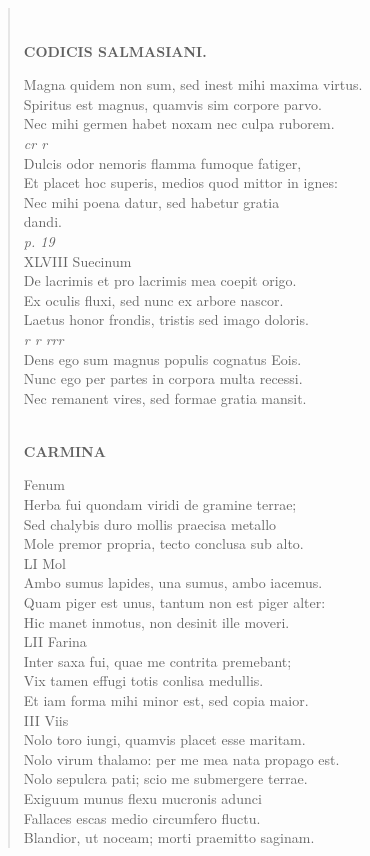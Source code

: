 \documentclass[11pt, a4paper]{report}
\begin{document}
\begin{verse}
        ﻿\pagebreak 
    \begin{center} \textbf{CODICIS SALMASIANI.} \end{center} \marginpar{[233]} Magna quidem non sum, sed inest mihi maxima virtus. \\ Spiritus est magnus, quamvis sim corpore parvo. \\ Nec mihi germen habet noxam nec culpa ruborem. \\ \textit{cr r} \\ Dulcis odor nemoris flamma fumoque fatiger, \\ Et placet hoc superis, medios quod mittor in ignes: \\ Nec mihi poena datur, sed habetur gratia \\ dandi. \\ \textit{p. 19} \\ XLVIII Suecinum \\ De lacrimis et pro lacrimis mea coepit origo. \\ Ex oculis fluxi, sed nunc ex arbore nascor. \\ Laetus honor frondis, tristis sed imago doloris. \\ \textit{r r rrr} \\ Dens ego sum magnus populis cognatus Eois. \\ Nunc ego per partes in corpora multa recessi. \\ Nec remanent vires, sed formae gratia mansit. \\ 
        ﻿\pagebreak 
    \begin{center} \textbf{CARMINA} \end{center} \marginpar{[234]}  \marginpar{[02]} Fenum \\ Herba fui quondam viridi de gramine terrae; \\ Sed chalybis duro mollis praecisa metallo \\ Mole premor propria, tecto conclusa sub alto. \\ LI Mol \\ Ambo sumus lapides, una sumus, ambo iacemus. \\ Quam piger est unus, tantum non est piger alter: \\ Hic manet inmotus, non desinit ille moveri. \\ LII Farina \\ Inter saxa fui, quae me contrita premebant; \\ Vix tamen effugi totis conlisa medullis. \\ Et iam forma mihi minor est, sed copia maior. \\ III Viis \\ Nolo toro iungi, quamvis placet esse maritam. \\ Nolo virum thalamo: per me mea nata propago est. \\ Nolo sepulcra pati; scio me submergere terrae. \\ Exiguum munus flexu mucronis adunci \\ Fallaces escas medio circumfero fluctu. \\ Blandior, ut noceam; morti praemitto saginam. \\ 

\end{verse}
\end{document}
